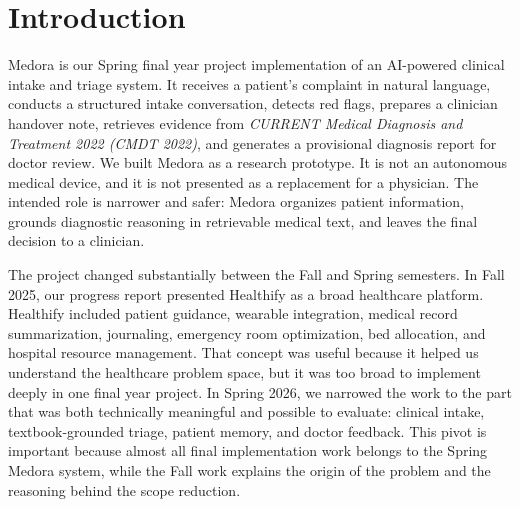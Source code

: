 
\chapter{Introduction}
\label{chapter:introduction}

Medora is our Spring final year project implementation of an AI-powered clinical intake and triage system. It receives a patient's complaint in natural language, conducts a structured intake conversation, detects red flags, prepares a clinician handover note, retrieves evidence from \textit{CURRENT Medical Diagnosis and Treatment 2022 (CMDT 2022)}, and generates a provisional diagnosis report for doctor review. We built Medora as a research prototype. It is not an autonomous medical device, and it is not presented as a replacement for a physician. The intended role is narrower and safer: Medora organizes patient information, grounds diagnostic reasoning in retrievable medical text, and leaves the final decision to a clinician.

The project changed substantially between the Fall and Spring semesters. In Fall 2025, our progress report presented Healthify as a broad healthcare platform. Healthify included patient guidance, wearable integration, medical record summarization, journaling, emergency room optimization, bed allocation, and hospital resource management. That concept was useful because it helped us understand the healthcare problem space, but it was too broad to implement deeply in one final year project. In Spring 2026, we narrowed the work to the part that was both technically meaningful and possible to evaluate: clinical intake, textbook-grounded triage, patient memory, and doctor feedback. This pivot is important because almost all final implementation work belongs to the Spring Medora system, while the Fall work explains the origin of the problem and the reasoning behind the scope reduction.


